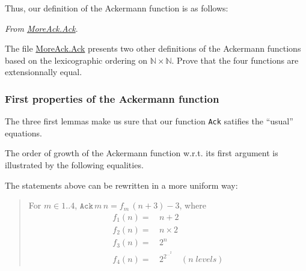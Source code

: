 




Thus, our definition of the Ackermann function is as follows:

\vspace{4pt}
\noindent
\emph{From \href{../theories/html/hydras.MoreAck.Ack.html}{MoreAck.Ack}}.





\begin{exercise}
The file \href{../theories/html/hydras.MoreAck.Ack.html}{MoreAck.Ack} presents two other definitions of the Ackermann functions based on the lexicographic ordering on $\mathbb{N}\times\mathbb{N}$.
Prove that the four functions are extensionnally equal.
\end{exercise}


\subsubsection{First properties of the Ackermann function}

The three first lemmas make us sure that our function 
\texttt{Ack} satifies the ``usual'' equations.




\vspace{4pt}

The order of growth of the Ackermann function w.r.t. its first argument is illustrated by the following equalities.







\begin{remark}
 The statements above can be rewritten in a more uniform way:

 \begin{quote}
   For $m\in 1..4$, $\texttt{Ack}\,m\,n = f_m\,(n+3)-3$, where 
   \begin{align*}
   f_1(n)=&\,n+2 \\
   f_2(n)=&\,n\times 2\\
   f_3(n)=&\,2^n\\
   f_4(n)=&\,2^{2^{\dots^2}}\quad(n\;\textit{levels})
   \end{align*}
 \end{quote}
\end{remark}


